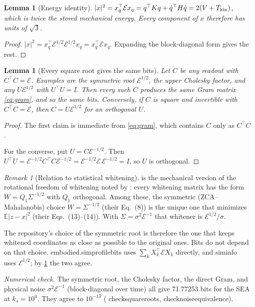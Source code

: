 \documentclass[11pt]{article}
\newtheorem{lemma}[theorem]{Lemma}
\theoremstyle{definition}
\theoremstyle{remark}
\newtheorem{remark}[theorem]{Remark}
\newcommand{\E}{\mathbb{E}}
\newcommand{\Em}{\mathcal{E}}         %
\newcommand{\codeus}{\textunderscore\allowbreak}
\newcommand{\code}[1]{{\ttfamily\let\_\codeus\hyphenchar\font=-1 #1}}
\newcommand{\checked}[1]{\par\smallskip\noindent\textit{Numerical check.} #1\par}
\begin{document}
\begin{lemma}[Energy identity]\label{lem:energy}
$|x|^2=x_q^\top\Em x_q=q^\top Kq+\dot q^\top H\dot q=2(V+T_{\rm kin})$, which is twice the
stored mechanical energy. Every component of $x$ therefore has units of $\sqrt{\mathrm J}$.
\end{lemma}
\begin{proof}
$|x|^2=x_q^\top\Em^{1/2}\Em^{1/2}x_q=x_q^\top\Em x_q$. Expanding the block-diagonal form
gives the rest.
\end{proof}

\begin{lemma}[Every square root gives the same bits]\label{lem:roots}
Let $C$ be any readout with $C^\top C=\Em$. Examples are the symmetric root
$\Em^{1/2}$, the upper Cholesky factor, and any $U\Em^{1/2}$ with $U^\top U=I$. Then every
such $C$ produces the same Gram matrix \eqref{eq:gram}, and so the same bits.
Conversely, if $C$ is square and invertible with $C^\top C=\Em$, then $C=U\Em^{1/2}$ for an
orthogonal $U$.
\end{lemma}
\begin{proof}
The first claim is immediate from \eqref{eq:gram}, which contains $C$ only as $C^\top C$.

For the converse, put $U=C\Em^{-1/2}$. Then
$U^\top U=\Em^{-1/2}C^\top C\Em^{-1/2}=\Em^{-1/2}\Em\,\Em^{-1/2}=I$, so $U$ is orthogonal.
\end{proof}

\begin{remark}[Relation to statistical whitening]
 is the mechanical version of the rotational freedom of whitening noted
by \citet[Eq.~(4)]{kessy2018optimal}: every whitening matrix has the form
$W=Q_1\Sigma^{-1/2}$ with $Q_1$ orthogonal. Among these, the symmetric
(ZCA--Mahalanobis) choice $W=\Sigma^{-1/2}$ (their Eq.~(8)) is the unique one that
minimizes $\E|z-x|^2$ (their Eqs.~(13)--(14)). With $\Sigma=\sigma^2\Em^{-1}$ that whitener
is $\Em^{1/2}/\sigma$.

The repository's choice of the symmetric root is therefore the one that keeps whitened
coordinates as close as possible to the original ones. Bits do not depend on that choice.
\code{embodied.sim\_profile\_bits} uses $\sum_kX_k^\top\Em X_k$ directly, and
\code{sim\_info} uses $\Em^{1/2}$; by \cref{lem:roots} the two agree.
\end{remark}

\checked{The symmetric root, the Cholesky factor, the direct Gram, and physical noise
$\sigma^2\Em^{-1}$ (block-diagonal over time) all give 71.77253 bits for the SEA at
$k_s=10^4$. They agree to $10^{-13}$ (\code{check\_square\_roots},
\code{check\_noise\_equivalence}).}
\end{document}
